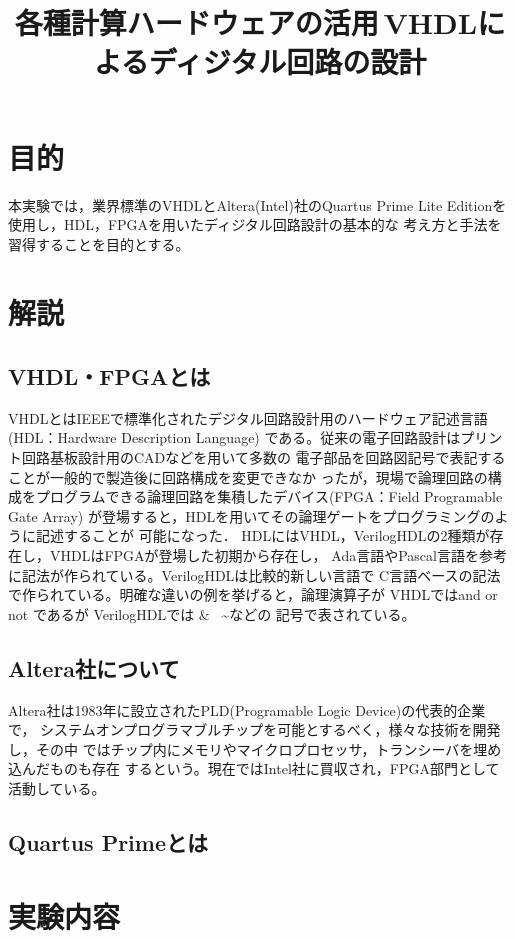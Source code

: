 \documentclass{ltjsarticle}
\title{各種計算ハードウェアの活用\,VHDLによるディジタル回路の設計}
\begin{document}
\maketitle

\section{目的}
本実験では，業界標準のVHDLとAltera(Intel)社のQuartus Prime Lite
Editionを使用し，HDL，FPGAを用いたディジタル回路設計の基本的な
考え方と手法を習得することを目的とする。
\section{解説}
	\subsection{VHDL・FPGAとは}
	VHDLとはIEEEで標準化されたデジタル回路設計用のハードウェア記述言語(HDL：Hardware Description Language)
	である。従来の電子回路設計はプリント回路基板設計用のCADなどを用いて多数の
	電子部品を回路図記号で表記することが一般的で製造後に回路構成を変更できなか
	ったが，現場で論理回路の構成をプログラムできる論理回路を集積したデバイス(FPGA：Field Programable Gate Array)
	が登場すると，HDLを用いてその論理ゲートをプログラミングのように記述することが
	可能になった．
	HDLにはVHDL，VerilogHDLの2種類が存在し，VHDLはFPGAが登場した初期から存在し，
	Ada言語やPascal言語を参考に記法が作られている\cite{ref:VerilogVHDL}。VerilogHDLは比較的新しい言語で
	C言語ベースの記法で作られている\cite{ref:VerilogVHDL}。明確な違いの例を挙げると，論理演算子が
	VHDLではand or not であるが VerilogHDLでは \& \textbar \, \textasciitilde などの
	記号で表されている。
	
	\subsection{Altera社について}
	Altera社は1983年に設立されたPLD(Programable Logic Device)の代表的企業で，
	システムオンプログラマブルチップを可能とするべく，様々な技術を開発し，その中
	ではチップ内にメモリやマイクロプロセッサ，トランシーバを埋め込んだものも存在
	するという。現在ではIntel社に買収され，FPGA部門として活動している。
	\subsection{Quartus Primeとは}
	

\section{実験内容}
\end{document}
